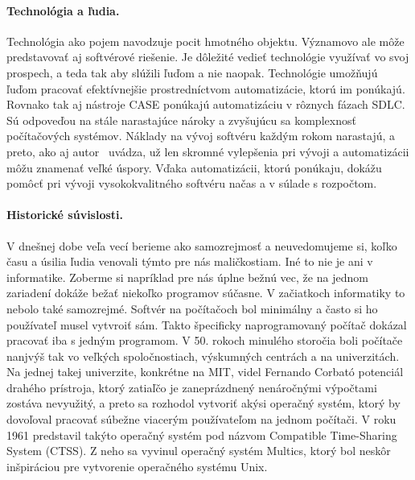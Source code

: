 \documentclass[10pt,twoside,slovak,a4paper]{article}
\begin{document}
 \paragraph{Technológia a ľudia.}
Technológia ako pojem navodzuje pocit hmotného objektu. Významovo ale môže predstavovať aj softvérové riešenie. Je dôležité vedieť technológie využívať vo svoj prospech, a teda tak aby slúžili ľuďom a nie naopak. Technológie umožňujú ľuďom pracovať efektívnejšie prostredníctvom automatizácie, ktorú im ponúkajú. Rovnako tak aj nástroje CASE ponúkajú automatizáciu v rôznych fázach SDLC. Sú odpoveďou na stále narastajúce nároky a zvyšujúcu sa komplexnosť počítačových systémov. Náklady na vývoj softvéru každým rokom narastajú, a preto, ako aj autor~\cite{2001} uvádza, už len skromné vylepšenia pri vývoji a automatizácii môžu znamenať veľké úspory. Vďaka automatizácii, ktorú ponúkaju, dokážu pomôcť pri vývoji vysokokvalitného softvéru načas a v súlade s rozpočtom.
 
 \paragraph{Historické súvislosti.}
 V dnešnej dobe veľa vecí berieme ako samozrejmosť a neuvedomujeme si, koľko času a úsilia ľudia venovali týmto pre nás maličkostiam. Iné to nie je ani v informatike. Zoberme si napríklad pre nás úplne bežnú vec, že na jednom zariadení dokáže bežať niekoľko programov súčasne. V začiatkoch informatiky to nebolo také samozrejmé. Softvér na počítačoch bol minimálny a často si ho používateľ musel vytvroiť sám. Takto špecificky naprogramovaný počítač dokázal pracovať iba s jedným programom. V 50. rokoch minulého storočia boli počítače nanjvýš tak vo veľkých spoločnostiach, výskumných centrách a na univerzitách. Na jednej takej univerzite, konkrétne na MIT, videl Fernando Corbató potenciál drahého prístroja, ktorý zatiaľčo je zaneprázdnený nenáročnými výpočtami zostáva nevyužitý, a preto sa rozhodol vytvoriť akýsi operačný systém, ktorý by dovoľoval pracovať súbežne viacerým používateľom na jednom počítači. V roku 1961 predstavil takýto operačný systém pod názvom Compatible Time-Sharing System (CTSS). Z neho sa vyvinul operačný systém Multics, ktorý bol neskôr inšpiráciou pre vytvorenie operačného systému Unix. 
 
\end{document}
